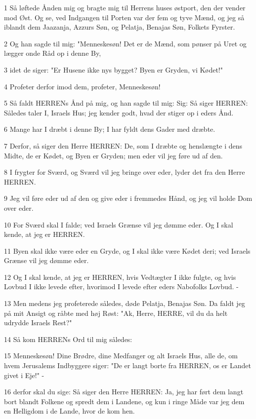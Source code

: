 \par 1 Så løftede Ånden mig og bragte mig til Herrens huses østport, den der vender mod Øst. Og se, ved Indgangen til Porten var der fem og tyve Mænd, og jeg så iblandt dem Jaazanja, Azzurs Søn, og Pelatja, Benajas Søn, Folkets Fyrster.
\par 2 Og han sagde til mig: "Menneskesøn! Det er de Mænd, som pønser på Uret og lægger onde Råd op i denne By,
\par 3 idet de siger: "Er Husene ikke nys bygget? Byen er Gryden, vi Kødet!"
\par 4 Profeter derfor imod dem, profeter, Menneskesøn!
\par 5 Så faldt HERRENs Ånd på mig, og han sagde til mig: Sig: Så siger HERREN: Således taler I, Israels Hus; jeg kender godt, hvad der stiger op i eders Ånd.
\par 6 Mange har I dræbt i denne By; I har fyldt dens Gader med dræbte.
\par 7 Derfor, så siger den Herre HERREN: De, som I dræbte og henslængte i dens Midte, de er Kødet, og Byen er Gryden; men eder vil jeg føre ud af den.
\par 8 I frygter for Sværd, og Sværd vil jeg bringe over eder, lyder det fra den Herre HERREN.
\par 9 Jeg vil føre eder ud af den og give eder i fremmedes Hånd, og jeg vil holde Dom over eder.
\par 10 For Sværd skal I falde; ved Israels Grænse vil jeg dømme eder. Og I skal kende, at jeg er HERREN.
\par 11 Byen skal ikke være eder en Gryde, og I skal ikke være Kødet deri; ved Israels Grænse vil jeg dømme eder.
\par 12 Og I skal kende, at jeg er HERREN, hvis Vedtægter I ikke fulgte, og hvis Lovbud I ikke levede efter, hvorimod I levede efter eders Nabofolks Lovbud. -
\par 13 Men medens jeg profeterede således, døde Pelatja, Benajas Søn. Da faldt jeg på mit Ansigt og råbte med høj Røst: "Ak, Herre, HERRE, vil du da helt udrydde Israels Rest?"
\par 14 Så kom HERRENs Ord til mig således:
\par 15 Menneskesøn! Dine Brødre, dine Medfanger og alt Israels Hus, alle de, om hvem Jerusalems Indbyggere siger: "De er langt borte fra HERREN, os er Landet givet i Eje!" -
\par 16 derfor skal du sige: Så siger den Herre HERREN: Ja, jeg har ført dem langt bort blandt Folkene og spredt dem i Landene, og kun i ringe Måde var jeg dem en Helligdom i de Lande, hvor de kom hen.
